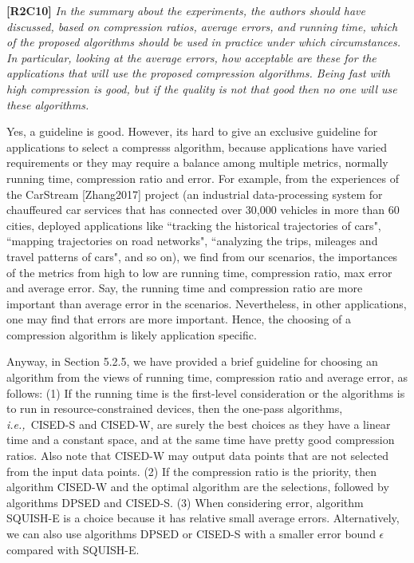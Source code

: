 \documentclass{letter}
\newcommand{\ie}{\emph{i.e.,}\xspace}
\begin{document}
\textbf{[R2C10]} \emph{In the summary about the experiments, the authors should have discussed, based on compression ratios, average errors, and running time, which of the proposed algorithms should be used in practice under which circumstances. In particular, looking at the average errors, how acceptable are these for the applications that will use the proposed compression algorithms. Being fast with high compression is good, but if the quality is not that good then no one will use these algorithms.}

Yes, a guideline is good. However, its hard to give an exclusive guideline for applications to select a compresss algorithm, because applications have varied requirements or they may require a balance among multiple metrics, normally running time, compression ratio and  error. For example, from the experiences of the CarStream [Zhang2017] project (an industrial data-processing system for chauffeured car services that has connected over 30,000 vehicles in more than 60 cities, deployed applications like ``tracking the historical trajectories of cars", ``mapping trajectories on road networks", ``analyzing the trips, mileages and travel patterns of cars", and so on), we find from our scenarios,  the importances of the metrics from high to low are running time, compression ratio, max error and average error. Say, the running time and compression ratio are more important than average error in the scenarios.
Nevertheless, in other applications, one may find that errors are more important.
Hence, the choosing of a compression algorithm is likely application specific.

Anyway, in Section 5.2.5, we have provided a brief guideline for choosing an algorithm from the views of running time, compression ratio and average error, as follows: 
(1) If the running time is the first-level consideration or the algorithms is to run in resource-constrained devices, then the one-pass algorithms, \ie~CISED-S and CISED-W, are surely the best choices as they have a linear time and a constant space, and at the same time have pretty good compression ratios. Also note that CISED-W may output data points that are not selected from the input data points.
%
(2) If the compression ratio is the priority, then algorithm CISED-W and the optimal algorithm are the selections, followed by algorithms DPSED and CISED-S.
%
(3) When considering error, algorithm SQUISH-E is a choice because it has relative small average errors. Alternatively, we can also use algorithms DPSED or CISED-S with a smaller error bound $\epsilon$ compared with SQUISH-E.
\end{document}
